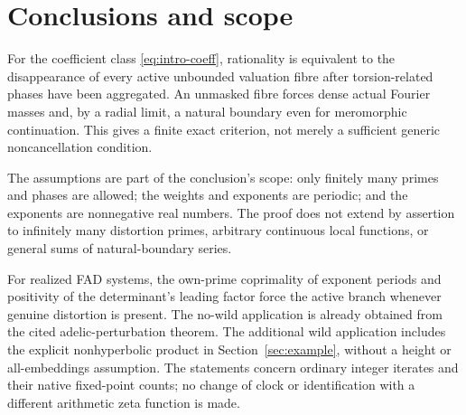 \section{Conclusions and scope}

For the coefficient class \eqref{eq:intro-coeff}, rationality is
equivalent to the disappearance of every active unbounded valuation
fibre after torsion-related phases have been aggregated.
An unmasked fibre forces dense actual Fourier masses and, by a
radial limit, a natural boundary even for meromorphic continuation.
This gives a finite exact criterion, not merely a sufficient
generic noncancellation condition.

The assumptions are part of the conclusion's scope: only finitely
many primes and phases are allowed; the weights and exponents are
periodic; and the exponents are nonnegative real numbers.
The proof does not extend by assertion to infinitely many distortion
primes, arbitrary continuous local functions, or general sums of
natural-boundary series.

For realized FAD systems, the own-prime coprimality of exponent
periods and positivity of the determinant's leading factor force
the active branch whenever genuine distortion is present.
The no-wild application is already obtained from the cited
adelic-perturbation theorem. The additional wild application includes
the explicit nonhyperbolic product in Section~\ref{sec:example},
without a height or all-embeddings assumption.
The statements concern ordinary integer iterates and their native
fixed-point counts; no change of clock or identification with a
different arithmetic zeta function is made.
